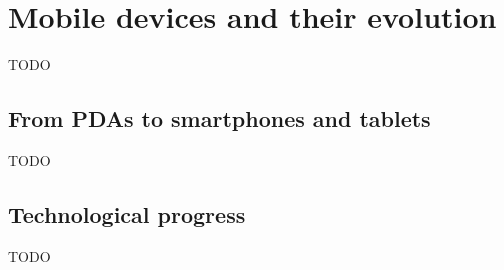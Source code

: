 \section{Mobile devices and their evolution}
TODO

\subsection{From PDAs to smartphones and tablets}
TODO

\subsection{Technological progress}
TODO
